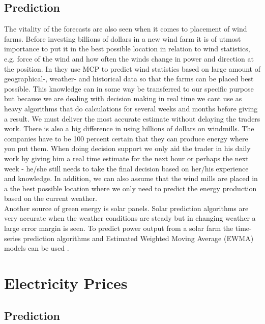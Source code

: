 \documentclass[twoside,11pt,openright]{report}
\begin{document}
\subsection{Prediction}

The vitality of the forecasts are also seen when it comes to
placement of wind farms. Before investing billions of dollars in a new wind farm it is of utmost importance to put it in the best possible location in relation to wind statistics, e.g. force of the wind and how often the winds change in power and direction at the position. In \cite{4} they use MCP to predict wind statistics based on large amount of geographical-, weather- and historical data so that the farms can be placed best possible. This knowledge can in some way be transferred to our specific purpose but because we are dealing with decision making in real time we cant use as heavy algorithms that do calculations for several weeks and months before giving a result. We must deliver the most accurate estimate without delaying the traders work.
There is also a big difference in using billions of dollars on windmills. The companies have to be 100 percent certain that they can produce energy where you put them. When doing decision support we only aid the trader in his daily work by giving him a real time estimate for the next hour or perhaps the next week - he/she still needs to take the final decision based on her/his experience and knowledge. In addition, we can also assume that the wind mills are placed in a the best possible location where we only need to predict the energy production based on the current weather.
\\[0.5cm]
Another source of green energy is solar panels. Solar
prediction algorithms are very accurate when the weather conditions are steady but in changing weather a large error margin is seen. To predict power output from a solar farm the time-series prediction algorithms and Estimated Weighted Moving Average (EWMA) models can be used \cite{5}.

\section{Electricity Prices}
\subsection{Prediction}

\\[0.5cm]

\\[0.5cm]

\\[0.5cm]

\end{document}

